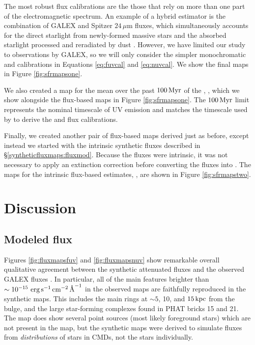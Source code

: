 \documentclass[iop, tighten]{emulateapj}
\begin{document}
The most robust flux calibrations are the those that rely on more than one part
of the electromagnetic spectrum. An example of a hybrid estimator is the
combination of GALEX \fuv{} and Spitzer $24\,\mu\mathrm{m}$ fluxes, which
simultaneously accounts for the direct starlight from newly-formed massive
stars and the absorbed starlight processed and reradiated by dust
\citep[e.g.,][]{Leroy:2012}. However, we have limited our study to observations
by GALEX, so we will only consider the simpler monochromatic \fuv{} and \nuv{}
calibrations in Equations \ref{eq:fuvcal} and \ref{eq:nuvcal}. We show
the final \sfrx{} maps in Figure \ref{fig:sfrmapsone}.

We also created a map for the mean \sfr{} over the past $100\,\mathrm{Myr}$ of the
, \sfroneh{}, which we show alongside the flux-based \sfr{} maps in
Figure \ref{fig:sfrmapsone}. The $100\,\mathrm{Myr}$ limit represents the nominal timescale
of UV emission and matches the timescale used by \citet{Hao:2011} to derive the
\fuv{} and \nuv{} flux calibrations.

Finally, we created another pair of flux-based \sfr{} maps derived just as
before, except instead we started with the intrinsic synthetic fluxes \fxsfhz{}
described in \S \ref{syntheticfluxmaps:fluxmod}. Because the fluxes were
intrinsic, it was not necessary to apply an extinction correction before
converting the fluxes into . The maps for the intrinsic flux-based
\sfr{} estimates, \sfrxz{}, are shown in Figure \ref{fig:sfrmapstwo}.




\section{Discussion}\label{discussion}



\subsection{Modeled flux}\label{discussion:modflux}

Figures \ref{fig:fluxmapsfuv} and \ref{fig:fluxmapsnuv} show remarkable
overall qualitative agreement between the synthetic attenuated fluxes \fxsfh{}
and the observed GALEX fluxes \fxobs{}. In particular, all of the main features
brighter than $\sim 10^{-15}\, \,\mathrm{erg}\,\mathrm{s}^{-1}\,\mathrm{cm}^{-2}\,\textrm{\AA}^{-1}$ in the observed maps are faithfully
reproduced in the synthetic maps. This includes the main rings at $\sim 5$, 10,
and $15\,\mathrm{kpc}$ from the bulge, and the large star-forming complexes found in PHAT
bricks 15 and 21. The \fnuvobs{} map does show several point sources (most
likely foreground stars) which are not present in the \fnuvsfh{} map, but the
synthetic maps were derived to simulate fluxes from \emph{distributions} of
stars in CMDs, not the stars individually.
\end{document}
